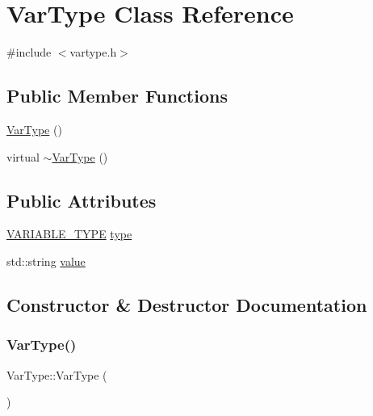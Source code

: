 \hypertarget{classVarType}{}\section{Var\+Type Class Reference}
\label{classVarType}


{\ttfamily \#include $<$vartype.\+h$>$}

\subsection*{Public Member Functions}
\begin{DoxyCompactItemize}
\item 
\hyperlink{classVarType_adddd6258ae800047f968361615eff16b}{Var\+Type} ()
\item 
virtual \hyperlink{classVarType_af090ea0ac8270c1566c592bd9b3df2e6}{$\sim$\+Var\+Type} ()
\end{DoxyCompactItemize}
\subsection*{Public Attributes}
\begin{DoxyCompactItemize}
\item 
\hyperlink{statics_8h_a4c85b3a98d55cc0252806c950379cce0}{V\+A\+R\+I\+A\+B\+L\+E\+\_\+\+T\+Y\+PE} \hyperlink{classVarType_ada5e661872d79bc92631a1ac384d459e}{type}
\item 
std\+::string \hyperlink{classVarType_adeb99cb6a17ce9cee53c165c912a333f}{value}
\end{DoxyCompactItemize}


\subsection{Constructor \& Destructor Documentation}
\mbox{\label{classVarType_adddd6258ae800047f968361615eff16b}} 
\subsubsection{\texorpdfstring{Var\+Type()}{VarType()}}
{\footnotesize\ttfamily Var\+Type\+::\+Var\+Type (\begin{DoxyParamCaption}{ }\end{DoxyParamCaption})}

\mbox{\label{classVarType_af090ea0ac8270c1566c592bd9b3df2e6}} 
